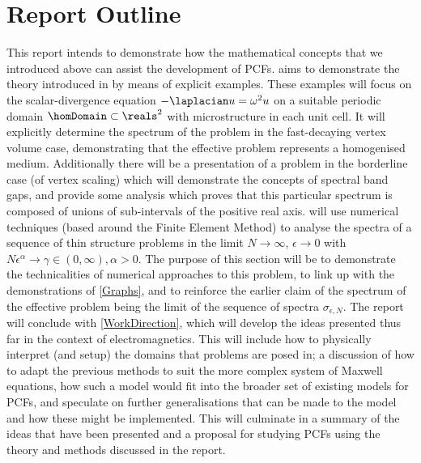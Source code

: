 \section{Report Outline}
This report intends to demonstrate how the mathematical concepts that we introduced above can assist the development of PCFs.
 aims to demonstrate the theory introduced in  by means of explicit examples. 
These examples will focus on the scalar-divergence equation $-\laplacian u=\omega^{2}u$ on a suitable periodic domain $\homDomain\subset\reals^{2}$ with microstructure in each unit cell.
It will explicitly determine the spectrum of the problem in the fast-decaying vertex volume case, demonstrating that the effective problem represents a homogenised medium.
Additionally there will be a presentation of a problem in the borderline case (of vertex scaling) which will demonstrate the concepts of spectral band gaps, and provide some analysis which proves that this particular spectrum is composed of unions of sub-intervals of the positive real axis.
 will use numerical techniques (based around the Finite Element Method) to analyse the spectra of a sequence of thin structure problems in the limit $N\rightarrow\infty$, $\epsilon\rightarrow0$ with $N\epsilon^{\alpha}\rightarrow\gamma\in(0,\infty), \alpha>0$.
The purpose of this section will be to demonstrate the technicalities of numerical approaches to this problem, to link up with the demonstrations of \cref{Graphs}, and to reinforce the earlier claim of the spectrum of the effective problem being the limit of the sequence of spectra $\sigma_{\epsilon, N}$.
The report will conclude with \cref{WorkDirection}, which will develop the ideas presented thus far in the context of electromagnetics.
This will include how to physically interpret (and setup) the domains that problems are posed in; a discussion of how to adapt the previous methods to suit the more complex system of Maxwell equations, how such a model would fit into the broader set of existing models for PCFs, and speculate on further generalisations that can be made to the model and how these might be implemented.
This will culminate in a summary of the ideas that have been presented and a proposal for studying PCFs using the theory and methods discussed in the report.